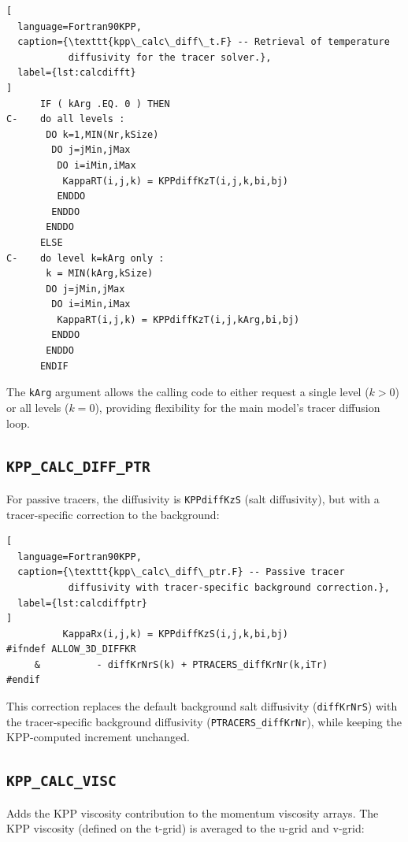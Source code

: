 \documentclass[12pt,letterpaper]{article}
\begin{document}
\begin{lstlisting}[  
  language=Fortran90KPP,  
  caption={\texttt{kpp\_calc\_diff\_t.F} -- Retrieval of temperature  
           diffusivity for the tracer solver.},  
  label={lst:calcdifft}  
]  
      IF ( kArg .EQ. 0 ) THEN  
C-    do all levels :  
       DO k=1,MIN(Nr,kSize)  
        DO j=jMin,jMax  
         DO i=iMin,iMax  
          KappaRT(i,j,k) = KPPdiffKzT(i,j,k,bi,bj)  
         ENDDO  
        ENDDO  
       ENDDO  
      ELSE  
C-    do level k=kArg only :  
       k = MIN(kArg,kSize)  
       DO j=jMin,jMax  
        DO i=iMin,iMax  
         KappaRT(i,j,k) = KPPdiffKzT(i,j,kArg,bi,bj)  
        ENDDO  
       ENDDO  
      ENDIF  
\end{lstlisting}  
  
The \texttt{kArg} argument allows the calling code to either request  
a single level ($k > 0$) or all levels ($k = 0$), providing  
flexibility for the main model's tracer diffusion loop.  
  
\subsection{\texttt{KPP\_CALC\_DIFF\_PTR}}  
  
For passive tracers, the diffusivity is \texttt{KPPdiffKzS} (salt  
diffusivity), but with a tracer-specific correction to the background:  
  
\begin{lstlisting}[  
  language=Fortran90KPP,  
  caption={\texttt{kpp\_calc\_diff\_ptr.F} -- Passive tracer  
           diffusivity with tracer-specific background correction.},  
  label={lst:calcdiffptr}  
]  
          KappaRx(i,j,k) = KPPdiffKzS(i,j,k,bi,bj)  
#ifndef ALLOW_3D_DIFFKR  
     &          - diffKrNrS(k) + PTRACERS_diffKrNr(k,iTr)  
#endif  
\end{lstlisting}  
  
This correction replaces the default background salt diffusivity  
(\texttt{diffKrNrS}) with the tracer-specific background diffusivity  
(\texttt{PTRACERS\_diffKrNr}), while keeping the KPP-computed  
increment unchanged.  
  
\subsection{\texttt{KPP\_CALC\_VISC}}  
  
Adds the KPP viscosity contribution to the momentum viscosity arrays.  
The KPP viscosity (defined on the t-grid) is averaged to the u-grid  
and v-grid:  
  
\end{document}
